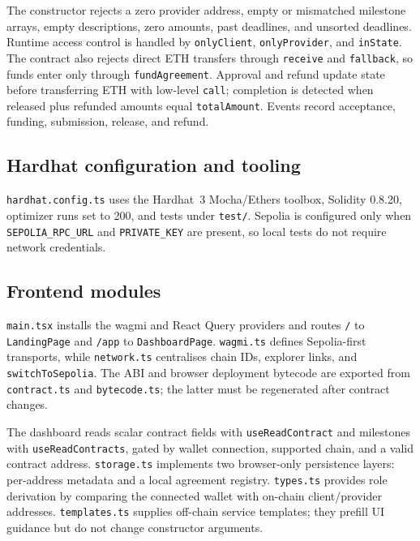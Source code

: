 \documentclass[12pt,a4paper]{article}
\begin{document}
The constructor rejects a zero provider address, empty or mismatched milestone
arrays, empty descriptions, zero amounts, past deadlines, and unsorted deadlines.
Runtime access control is handled by \texttt{onlyClient}, \texttt{onlyProvider},
and \texttt{inState}. The contract also rejects direct ETH transfers through
\texttt{receive} and \texttt{fallback}, so funds enter only through
\texttt{fundAgreement}. Approval and refund update state before transferring ETH
with low-level \texttt{call}; completion is detected when released plus refunded
amounts equal \texttt{totalAmount}. Events record acceptance, funding,
submission, release, and refund.

\subsection{Hardhat configuration and tooling}

\texttt{hardhat.config.ts} uses the Hardhat~3 Mocha/Ethers toolbox, Solidity
0.8.20, optimizer runs set to 200, and tests under \texttt{test/}. Sepolia is
configured only when \texttt{SEPOLIA\_RPC\_URL} and \texttt{PRIVATE\_KEY} are
present, so local tests do not require network credentials.

\subsection{Frontend modules}

\texttt{main.tsx} installs the wagmi and React Query providers and routes
\texttt{/} to \texttt{LandingPage} and \texttt{/app} to \texttt{DashboardPage}.
\texttt{wagmi.ts} defines Sepolia-first transports, while \texttt{network.ts}
centralises chain IDs, explorer links, and \texttt{switchToSepolia}. The ABI and
browser deployment bytecode are exported from \texttt{contract.ts} and
\texttt{bytecode.ts}; the latter must be regenerated after contract changes.

The dashboard reads scalar contract fields with \texttt{useReadContract} and
milestones with \texttt{useReadContracts}, gated by wallet connection, supported
chain, and a valid contract address. \texttt{storage.ts} implements two
browser-only persistence layers: per-address metadata and a local agreement
registry. \texttt{types.ts} provides role derivation by comparing the connected
wallet with on-chain client/provider addresses. \texttt{templates.ts} supplies
off-chain service templates; they prefill UI guidance but do not change
constructor arguments.
\end{document}
